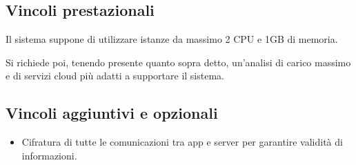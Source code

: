 \subsection{Vincoli prestazionali}

Il sistema suppone di utilizzare istanze da massimo 2 CPU e 1GB di memoria.

Si richiede poi, tenendo presente quanto sopra detto, un'analisi di carico massimo e di servizi cloud più adatti a supportare il sistema.

\subsection{Vincoli aggiuntivi e opzionali}
\begin{itemize}
    \item Cifratura di tutte le comunicazioni tra app e server per garantire validità di informazioni.
\end{itemize}
